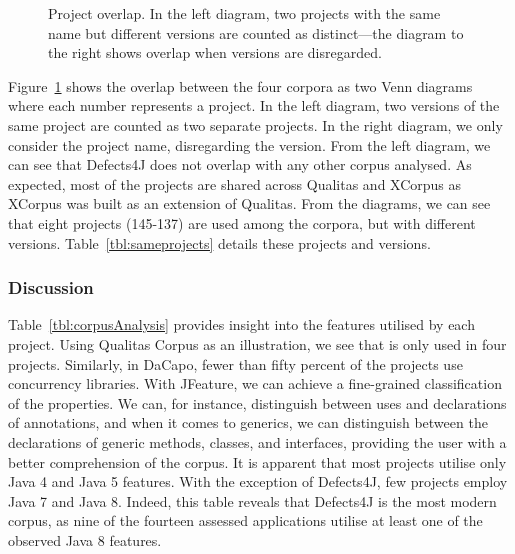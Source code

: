 \begin{figure}[b]

\caption{\label{fig:corporaOverlap} Project overlap. In the left diagram, two projects with the same name but different versions are counted as distinct---the diagram to the right shows overlap when versions are disregarded.}
\end{figure}
Figure~\ref{fig:corporaOverlap} shows the overlap between the four corpora as two Venn diagrams where each number represents a project. In the left diagram,  two versions of the same project are counted as two separate projects. In the right diagram, we only consider the project name, disregarding the version.
From the left diagram, we can see that Defects4J does not overlap with any other corpus analysed. As expected, most of the projects are shared across Qualitas and XCorpus as XCorpus was built as an extension of Qualitas. From the diagrams, we can see that eight projects (145-137) are used among the corpora, but with different versions. Table~\ref{tbl:sameprojects} details these projects and versions.




\subsubsection*{\textbf{Discussion}}
Table~\ref{tbl:corpusAnalysis} provides insight into the features utilised by each project. Using Qualitas Corpus as an illustration, we see that  is only used in four projects.
Similarly, in DaCapo, fewer than fifty percent of the projects use concurrency libraries.
With JFeature, we can achieve a fine-grained classification of the properties. We can, for instance, distinguish between uses and declarations of annotations, and when it comes to generics, we can distinguish between the declarations of generic methods, classes, and interfaces, providing the user with a better comprehension of the corpus.
It is apparent that most projects utilise only Java 4 and Java 5 features. With the exception of Defects4J, few projects employ Java 7 and Java 8.
Indeed, this table reveals that Defects4J is the most modern corpus, as nine of the fourteen assessed applications utilise at least one of the observed Java 8 features.


